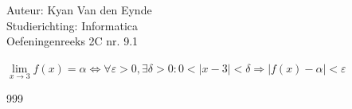 \documentclass[a4paper]{article}
\begin{document}
  
\noindent \large Auteur: Kyan Van den Eynde \\
\noindent \large Studierichting: Informatica\\
\noindent \large Oefeningenreeks 2C nr. 9.1\\

\medskip

\normalsize

$\lim\limits_{x\rightarrow 3}f(x) = \alpha \Leftrightarrow \forall \varepsilon > 0, \exists \delta > 0 : 0 < |x-3| < \delta \Rightarrow |f(x) - \alpha| < \varepsilon$\\

\begin{thebibliography}{999}
\end{thebibliography}
\end{document}
